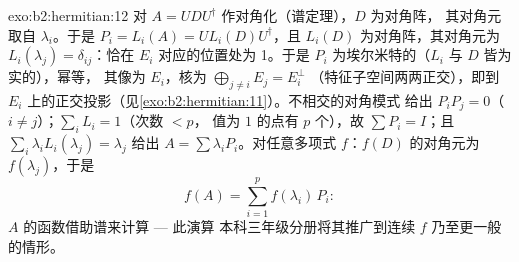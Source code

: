 \begin{solution}{exo:b2:hermitian:12}
对 $A = U D U^\dagger$ 作对角化（谱定理），$D$ 为对角阵，
其对角元取自 $\lambda_i$。于是 $P_i = L_i(A) = U
L_i(D)U^\dagger$，且 $L_i(D)$ 为对角阵，其对角元为
$L_i(\lambda_j) = \delta_{ij}$：恰在
$E_i$ 对应的位置处为 1。于是 $P_i$ 为埃尔米特的（$L_i$ 与 $D$ 皆为实的），幂等，
其像为 $E_i$，核为 $\bigoplus_{j\neq i}E_j = E_i^\perp$
（特征子空间两两正交），即到
$E_i$ 上的正交投影（见\cref{exo:b2:hermitian:11}）。不相交的对角模式
给出 $P_iP_j = 0$（$i \neq j$）；$\sum_i L_i = 1$（次数 $< p$，
值为 $1$ 的点有 $p$ 个），故 $\sum P_i = I$；且 $\sum_i
\lambda_iL_i(\lambda_j) = \lambda_j$ 给出 $A = \sum
\lambda_iP_i$。对任意多项式 $f$：$f(D)$ 的对角元为
$f(\lambda_j)$，于是
\[
f(A) = \sum_{i=1}^{p} f(\lambda_i)\,P_i :
\]
$A$ 的函数借助谱来计算 --- 此演算
本科三年级分册将其推广到连续 $f$ 乃至更一般的情形。
\end{solution}

